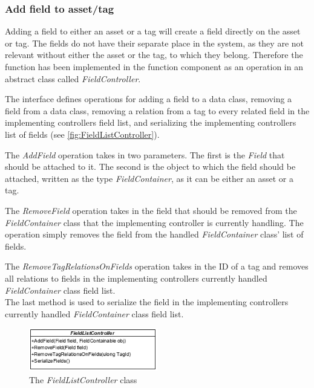 \subsubsection{Add field to asset/tag}
Adding a field to either an asset or a tag will create a field directly on the asset or tag. The fields do not have their separate place in the system, as they are not relevant without either the asset or the tag, to which they belong. Therefore the function has been implemented in the function component as an operation in an abstract class called \textit{FieldController}.
\par
The interface defines operations for adding a field to a data class, removing a field from a data class, removing a relation from a tag to every related field in the implementing controllers field list, and serializing the implementing controllers list of fields (see \autoref{fig:FieldListController}).
\par
The \textit{AddField} operation takes in two parameters. The first is the \textit{Field} that should be attached to it. The second is the object to which the field should be attached, written as the type \textit{FieldContainer}, as it can be either an asset or a tag. 
\par
The \textit{RemoveField} operation takes in the field that should be removed from the \textit{FieldContainer} class that the implementing controller is currently handling. The operation simply removes the field from the handled \textit{FieldContainer} class' list of fields.
\par
The \textit{RemoveTagRelationsOnFields} operation takes in the ID of a tag and removes all relations to fields in the implementing controllers currently handled \textit{FieldContainer} class field list.\\
The last method is used to serialize the field in the implementing controllers currently handled \textit{FieldContainer} class field list.

\begin{figure}[H]
    \centering
    \includegraphics[width=0.5\textwidth]{figures/FunctionComponent/FieldListController.png}
    \caption{The \textit{FieldListController} class}
    \label{fig:FieldListController}
\end{figure}

